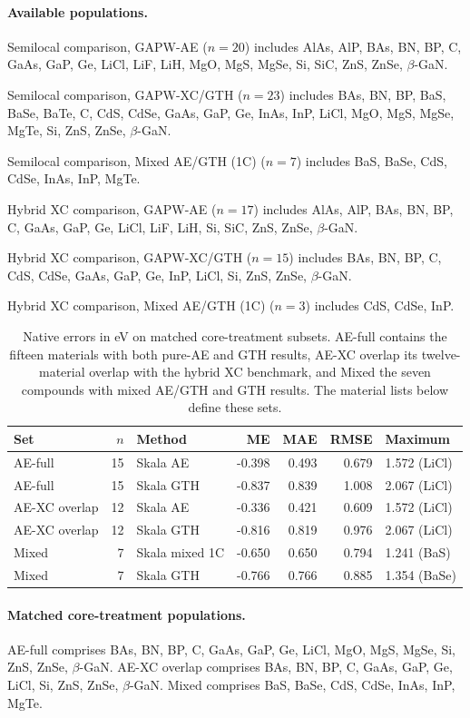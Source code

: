 \documentclass[10pt,a4paper]{article}
\begin{document}
\paragraph{Available populations.}
Semilocal comparison, GAPW-AE ($n=20$) includes AlAs, AlP, BAs, BN, BP, C, GaAs, GaP, Ge, LiCl, LiF, LiH, MgO, MgS, MgSe, Si, SiC, ZnS, ZnSe, $\beta$-GaN.

Semilocal comparison, GAPW-XC/GTH ($n=23$) includes BAs, BN, BP, BaS, BaSe, BaTe, C, CdS, CdSe, GaAs, GaP, Ge, InAs, InP, LiCl, MgO, MgS, MgSe, MgTe, Si, ZnS, ZnSe, $\beta$-GaN.

Semilocal comparison, Mixed AE/GTH (1C) ($n=7$) includes BaS, BaSe, CdS, CdSe, InAs, InP, MgTe.

Hybrid XC comparison, GAPW-AE ($n=17$) includes AlAs, AlP, BAs, BN, BP, C, GaAs, GaP, Ge, LiCl, LiF, LiH, Si, SiC, ZnS, ZnSe, $\beta$-GaN.

Hybrid XC comparison, GAPW-XC/GTH ($n=15$) includes BAs, BN, BP, C, CdS, CdSe, GaAs, GaP, Ge, InP, LiCl, Si, ZnS, ZnSe, $\beta$-GaN.

Hybrid XC comparison, Mixed AE/GTH (1C) ($n=3$) includes CdS, CdSe, InP.
\begin{table}[htbp]
\centering
\caption{Native errors in eV on matched core-treatment subsets. AE-full contains the fifteen materials with both pure-AE and GTH results, AE-XC overlap its twelve-material overlap with the hybrid XC benchmark, and Mixed the seven compounds with mixed AE/GTH and GTH results. The material lists below define these sets.}\label{tab:bandgap-core-subsets}
\begin{tabular}{lrlrrrl}
\toprule
Set & $n$ & Method & ME & MAE & RMSE & Maximum \\
\midrule
AE-full & 15 & Skala AE & -0.398 & 0.493 & 0.679 & 1.572 (LiCl) \\
AE-full & 15 & Skala GTH & -0.837 & 0.839 & 1.008 & 2.067 (LiCl) \\
AE-XC overlap & 12 & Skala AE & -0.336 & 0.421 & 0.609 & 1.572 (LiCl) \\
AE-XC overlap & 12 & Skala GTH & -0.816 & 0.819 & 0.976 & 2.067 (LiCl) \\
Mixed & 7 & Skala mixed 1C & -0.650 & 0.650 & 0.794 & 1.241 (BaS) \\
Mixed & 7 & Skala GTH & -0.766 & 0.766 & 0.885 & 1.354 (BaSe) \\
\bottomrule
\end{tabular}
\end{table}
\FloatBarrier
\paragraph{Matched core-treatment populations.}
AE-full comprises BAs, BN, BP, C, GaAs, GaP, Ge, LiCl, MgO, MgS, MgSe, Si, ZnS, ZnSe, $\beta$-GaN.
AE-XC overlap comprises BAs, BN, BP, C, GaAs, GaP, Ge, LiCl, Si, ZnS, ZnSe, $\beta$-GaN.
Mixed comprises BaS, BaSe, CdS, CdSe, InAs, InP, MgTe.
\end{document}
